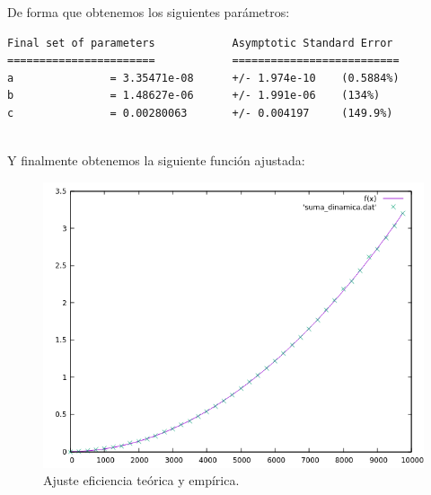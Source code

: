 De forma que obtenemos los siguientes parámetros:

\begin{shaded*}
\begin{verbatim}
Final set of parameters            Asymptotic Standard Error
=======================            ==========================
a               = 3.35471e-08      +/- 1.974e-10    (0.5884%)
b               = 1.48627e-06      +/- 1.991e-06    (134%)
c               = 0.00280063       +/- 0.004197     (149.9%)


\end{verbatim}
\end{shaded*}

Y finalmente obtenemos la siguiente función ajustada:
\begin{figure}[H]
    \begin{center}
        \includegraphics[scale=0.7]{imagenes/suma_dinamica_adj.png}
        \caption{Ajuste eficiencia teórica y empírica.}
        \label{fig20}
    \end{center}
\end{figure}


\newpage



